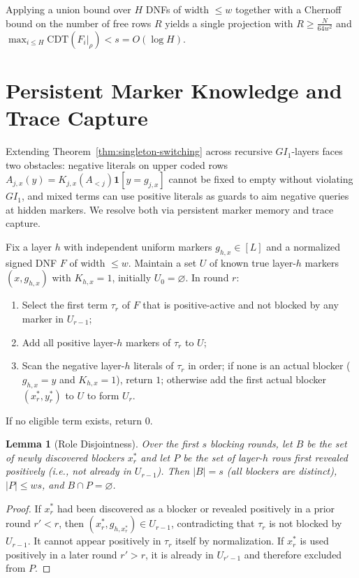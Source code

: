 \documentclass[11pt,a4paper]{article}
\newtheorem{lemma}[theorem]{Lemma}
\theoremstyle{definition}
\theoremstyle{remark}
\newcommand{\CDT}{\mathrm{CDT}}
\newcommand{\GI}{GI_1}
\begin{document}
Applying a union bound over $H$ DNFs of width $\le w$ together with a Chernoff bound on the number of free rows $R$ yields a single projection with $R \ge \frac{N}{64w^2}$ and $\max_{i \le H} \CDT(F_i|_\rho) < s = O(\log H)$.

\section{Persistent Marker Knowledge and Trace Capture}

Extending Theorem~\ref{thm:singleton-switching} across recursive $\GI$-layers faces two obstacles: negative literals on upper coded rows $A_{j,x}(y) = K_{j,x}(A_{<j})\mathbf{1}[y = g_{j,x}]$ cannot be fixed to empty without violating $\GI$, and mixed terms can use positive literals as guards to aim negative queries at hidden markers. We resolve both via persistent marker memory and trace capture.

Fix a layer $h$ with independent uniform markers $g_{h,x} \in [L]$ and a normalized signed DNF $F$ of width $\le w$. Maintain a set $U$ of known true layer-$h$ markers $(x, g_{h,x})$ with $K_{h,x} = 1$, initially $U_0 = \varnothing$. In round $r$:
\begin{enumerate}
  \item Select the first term $\tau_r$ of $F$ that is positive-active and not blocked by any marker in $U_{r-1}$;
  \item Add all positive layer-$h$ markers of $\tau_r$ to $U$;
  \item Scan the negative layer-$h$ literals of $\tau_r$ in order; if none is an actual blocker ($g_{h,x} = y$ and $K_{h,x} = 1$), return $1$; otherwise add the first actual blocker $(x_r^*, y_r^*)$ to $U$ to form $U_r$.
\end{enumerate}
If no eligible term exists, return $0$.

\begin{lemma}[Role Disjointness]
\label{lem:role-disjoint}
Over the first $s$ blocking rounds, let $B$ be the set of newly discovered blockers $x_r^*$ and let $P$ be the set of layer-$h$ rows \emph{first} revealed positively (i.e., not already in $U_{r-1}$). Then $|B| = s$ (all blockers are distinct), $|P| \le ws$, and $B \cap P = \varnothing$.
\end{lemma}

\begin{proof}
If $x_r^*$ had been discovered as a blocker or revealed positively in a prior round $r' < r$, then $(x_r^*, g_{h,x_r^*}) \in U_{r-1}$, contradicting that $\tau_r$ is not blocked by $U_{r-1}$. It cannot appear positively in $\tau_r$ itself by normalization. If $x_r^*$ is used positively in a later round $r' > r$, it is already in $U_{r'-1}$ and therefore excluded from $P$.
\end{proof}
\end{document}
